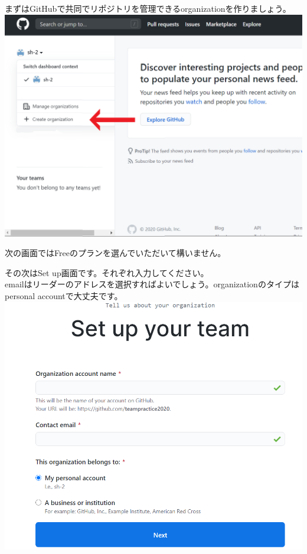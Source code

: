 \documentclass[
]{book}
\begin{document}
まずはGitHubで共同でリポジトリを管理できるorganizationを作りましょう。\\
\includegraphics{pics/organization.png}

次の画面ではFreeのプランを選んでいただいて構いません。

その次はSet up画面です。それぞれ入力してください。\\
emailはリーダーのアドレスを選択すればよいでしょう。organizationのタイプはpersonal accountで大丈夫です。\\
\includegraphics{pics/setup.png}
\end{document}
